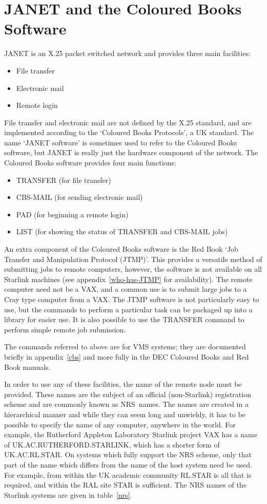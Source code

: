 \section{JANET and the Coloured Books Software}

JANET is an X.25 packet switched network and provides three main facilities:
\begin{itemize}
\item File transfer
\item Electronic mail
\item Remote login
\end{itemize}
File transfer and electronic mail are not defined by the X.25 standard, and are
implemented according to the `Coloured Books Protocols', a UK standard.
The name `JANET software' is sometimes used to refer to the Coloured Books
software, but JANET is really just the hardware component of the network.
The Coloured Books software provides four main functions:
\begin{itemize}
\item TRANSFER (for file transfer)
\item CBS-MAIL (for sending electronic mail)
\item PAD (for beginning a remote login)
\item LIST (for showing the status of TRANSFER and CBS-MAIL jobs)
\end{itemize}
An extra component of the Coloured Books software is the Red Book `Job Transfer
and Manipulation Protocol (JTMP)'. This provides a versatile method of
submitting jobs to remote computers, however, the software is not available on
all Starlink machines (see appendix~\ref{who-has-JTMP} for availability). The
remote computer need not be a VAX, and a common use is to submit large jobs to
a Cray type computer from a VAX. The JTMP software is not particularly easy to
use, but the commands to perform a particular task can be packaged up into a
library for easier use. It is also possible to use the TRANSFER command to
perform simple remote job submission.

The commands referred to above are for VMS systems; they are documented briefly
in appendix~\ref{cbs} and more fully in the DEC Coloured Books and Red Book
manuals.

In order to use any of these facilities, the name of the remote node must be
provided. These names are the subject of an official (non-Starlink)
registration scheme and are commonly known as NRS~names. The names are created
in a hierarchical manner and while they can seem long and unwieldy, it has to
be possible to specify the name of any computer, anywhere in the world. For
example, the Rutherford Appleton Laboratory Starlink project VAX has a name of
UK.AC.\-RUTHERFORD.\-STARLINK, which has a shorter form of UK.AC.RL.STAR. On
systems which fully support the NRS scheme, only that part of the name which
differs from the name of the host system need be used. For example, from within
the UK academic community RL.STAR is all that is required, and within the RAL
site STAR is sufficient. The NRS names of the Starlink systems are given in
table~\ref{nrs}.

